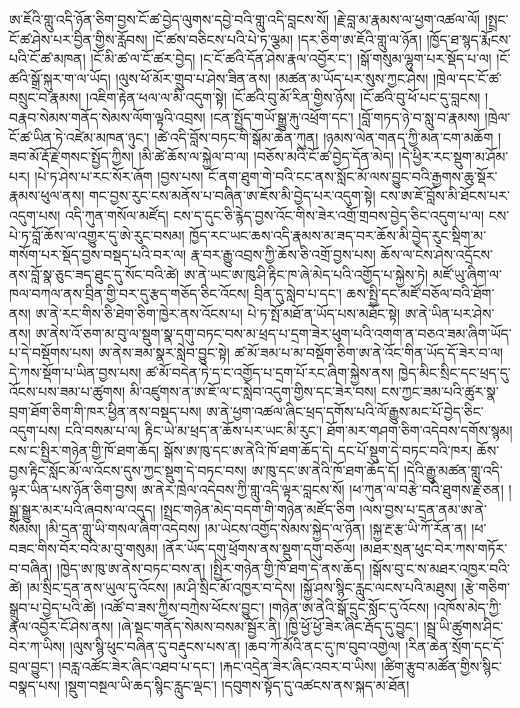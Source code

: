 \documentclass{article}
\begin{document}
ཨ་ཇོའི་གླུ་འདི་ཉོན་ཅིག་བྱས་ངོ་ཚ་བྱེད་ལུགས་དབྱེ་བའི་གླུ་འདི་བླངས་སོ། །རྗེ་བླ་མ་རྣམས་ལ་ཕྱག་འཚལ་ལོ། །སྤྲང་ངོ་ཚ་ཤེས་པར་བྱིན་གྱིས་རློབས། །ངོ་ཚས་བཅིངས་པའི་པེ་ཏ་ལྕམ། །དར་ཅིག་ཨ་ཇོའི་གླུ་ལ་ཉོན། །ཁྱོད་ཐ་སྙད་རྨོངས་པའི་ངོ་ཚ་མཁན། །ངོ་མི་ཚ་ལ་ངོ་ཚར་བྱེད། །ང་ངོ་ཚའི་དོན་ཤེས་རྣལ་འབྱོར་ང་། །སྒོ་གསུམ་ལྷུག་པར་སྡོད་པ་ལ། །ངོ་ཚའི་སྒྲོ་སྐུར་ག་ལ་ཡོད། །ལུས་ཕོ་མོར་གྲུབ་པ་ཤེས་ཟིན་ནས། །མཚན་མ་ཡོད་པར་སུས་ཀྱང་ཤེས། །ཁྲེལ་དང་ངོ་ཚ་བསྲུང་བ་རྣམས། །འཇིག་རྟེན་ཕལ་ལ་མི་འདུག་སྟེ། །ངོ་ཚའི་བུ་མོ་རིན་གྱིས་ཉོས། །ངོ་ཚའི་བུ་ཕོ་པང་དུ་བླངས། །བརྣབ་སེམས་གནོད་སེམས་ལོག་ལྟའི་འབྲས། །ངན་སྤྱོད་གཡོ་སྒྱུ་རྐུ་འཕྲོག་དང་། །བློ་གཏད་ཉེ་བ་སླུ་བ་རྣམས། །ཁྲེལ་ངོ་ཚ་ཡིན་ཏེ་འཛེམ་མཁན་ཉུང་། །ཚེ་འདི་བློས་བཏང་གི་སྒོམ་ཆེན་ཀུན། །ཉམས་ལེན་གནད་ཀྱི་མན་ངག་མཆོག །ཟབ་མོ་རྡོ་རྗེ་གསང་སྤྱོད་ཀྱིས། །མི་ཚེ་ཆོས་ལ་སྐྱེལ་བ་ལ། །བཅོས་མའི་ངོ་ཚ་བྱེད་དོན་མེད། །དེ་ཕྱིར་རང་སྡུག་མ་ཤོམ་པར། །པེ་ཏ་ཤེས་པ་རང་སོར་ཞོག །བྱས་པས། ངོ་ནག་ཐུག་གེ་བའི་ངང་ནས་སློང་མོ་ལས་བྱུང་བའི་རྒྱགས་ཆུ་སྡོར་རྣམས་ཕུལ་ནས། གང་བྱས་རུང་ངས་མནོས་པ་བཞིན་ཨ་ཇོས་མི་བྱེད་པར་འདུག་སྟེ། ངས་ཨ་ཇོ་བློས་མི་ཐོངས་པར་འདུག་པས། འདི་ཀུན་གསོལ་མཛོད། ངས་ད་དུང་ཅི་རྙེད་བྱས་འོང་གིས་ཟེར་འགྲོ་གྲབས་བྱེད་ཅིང་འདུག་པ་ལ། ངས་པེ་ཏ་བློ་ཆོས་ལ་འགྱུར་དུ་ཨེ་རུང་བསམ། ཁྱོད་རང་ཡང་ཆས་འདི་རྣམས་མ་ཟད་བར་ཆོས་མི་བྱེད་རུང་སྡིག་མ་གསོག་པར་སྡོད་བྱས་བསྡད་པའི་བར་ལ། རྣ་བར་རྒྱུ་འབྲས་ཀྱི་ཆོས་ཅི་འགྲོ་བྱས་པས། ཆོས་ལ་ངེས་ཤེས་འདྲོངས་ནས་བློ་སྣ་ཅུང་ཟད་ཐུང་དུ་སོང་བའི་ཚེ། ཨ་ནེ་ཡང་ཨ་ཁུ་ཤི་རྟིང་ཁ་ཞེ་མེད་པའི་འགྱོད་པ་སྐྱེས་ཏེ། མཛོ་ཡུ་ཞིག་ལ་ཁལ་བཀལ་ནས་བྲིན་གྱི་བར་དུ་རྩད་གཅོད་ཅིང་འོངས། བྲིན་དུ་སླེབ་པ་དང་། ཆས་སྤྱི་དང་མཛོ་བཅོལ་བའི་ཐོག་ནས། ཨ་ནེ་རང་གིས་ཅི་ཐེག་ཅིག་ཁྱེར་ནས་འོངས་པ། པེ་ཏ་སྤོ་མཐོ་ན་ཡོད་པས་མཐོང་སྟེ། ཨ་ནེ་ཡིན་པར་ཤེས་ནས། ཨ་ནེས་འོ་ཅག་མ་བུ་ལ་སྡུག་སྣ་དགུ་བཏང་བས་མ་ཕྲད་པ་དྲག་ཟེར་ཕུག་པའི་འགག་ན་བཅའ་ཟམ་ཞིག་ཡོད་པ་དེ་བསྡོགས་པས། ཨ་ནེས་ཟམ་སྣར་སླེབ་བྱུང་སྟེ། ཚ་མོ་ཟམ་པ་མ་བསྡོག་ཅིག་ཨ་ནེ་འོང་གིན་ཡོད་དོ་ཟེར་བ་ལ། དེ་ཀས་སྡོག་པ་ཡིན་བྱས་པས། ཚ་མོ་བདེན་ཏེ་ད་ང་འགྱོད་པ་དྲག་པོ་རང་ཞིག་སྐྱེས་ནས། ཁྱེད་མིང་སྲིང་དང་ཕྲད་དུ་འོངས་པས་ཟམ་པ་ཚུགས། མི་འཛུགས་ན་ཨ་ཇོ་ལ་ང་སླེབ་འདུག་གྱིས་དང་ཟེར་བས། ངས་ཀྱང་ཟམ་པའི་ཚུར་སྣ་བྲག་ཐོག་ཅིག་གི་ཁར་ཕྱིན་ནས་བསྡད་པས། ཨ་ནེ་ཕྱག་འཚལ་ཞིང་ཕྲད་དགོས་པའི་ལོ་རྒྱུས་མང་པོ་བྱེད་ཅིང་འདུག་པས། ངའི་བསམ་པ་ལ། རྟིང་ཡེ་མ་ཕྲད་ན་ཆོས་པར་ཡང་མི་རུང་། ཐོག་མར་གཤག་ཅིག་འདེབས་དགོས་སྙམ། ངས་ང་སྤྱིར་གཉེན་གྱི་ཁོ་ཐག་ཆོད། སྒོས་ཨ་ཁུ་དང་ཨ་ནེའི་ཁོ་ཐག་ཆོད་དེ། དང་པོ་སྡུག་དེ་བཏང་བའི་ཁར། ཆོས་བྱས་རྟིང་སློང་མོ་ལ་འོངས་དུས་ཀྱང་སྡུག་དེ་བཏང་བས། ཨ་ཁུ་དང་ཨ་ནེའི་ཁོ་ཐག་ཆོད་དོ། །དེའི་རྒྱུ་མཚན་གླུ་འདི་ལྟར་ཡིན་པས་ཉོན་ཅིག་བྱས། ཨ་ནེར་ཁྲེལ་འདེབས་ཀྱི་གླུ་འདི་ལྟར་བླངས་སོ། །ཕ་ཀུན་ལ་བརྩེ་བའི་ཐུགས་རྗེ་ཅན། །སྒྲ་སྒྱུར་མར་པའི་ཞབས་ལ་འདུད། །སྤྲང་གཉེན་མེད་བདག་གི་གཉེན་མཛོད་ཅིག །ལས་བྱས་པ་དྲན་ནམ་ཨ་ནེ་སོམས། །མི་དྲན་གླུ་ཡི་གསལ་ཞིག་འདེབས། །མ་ཡེངས་འགྱོད་སེམས་སྐྱེད་ལ་ཉོན། །སྐྱ་རྔ་རྩ་ཡི་ཀོ་རོན་ན། །ཕ་བཟང་གིས་བོར་བའི་མ་བུ་གསུམ། །ནོར་ཡོད་དགུ་ཕྲོགས་ནས་སྡུག་དགུ་བཅོལ། །མཐར་སྲན་ཕུང་བེར་ཀས་གཏོར་བ་བཞིན། །ཁྱེད་ཨ་ཁུ་ཨ་ནེས་བཏང་བས་ན། །སྤྱིར་གཉེན་གྱི་ཁོ་ཐག་དེ་ནས་ཆོད། །སྒོས་བུ་ང་ས་མཐར་འཁྱར་བའི་ཚེ། །མ་སྲིང་དྲན་ནས་ཡུལ་དུ་འོངས། །མ་ཤི་སྲིང་མོ་འཁྱར་བ་དེས། །སྐྱོ་ཤས་སྙིང་རླུང་ལངས་པའི་མཐུས། །རྩེ་གཅིག་སྒྲུབ་པ་བྱེད་པའི་ཚེ། །འཚོ་བ་ཟས་ཀྱིས་བཀྲེས་ཕོངས་བྱུང་། །གཉེན་ཨ་ནེའི་སྒོ་དྲུང་སློང་དུ་འོངས། །འཁོས་མེད་ཀྱི་རྣལ་འབྱོར་ངོ་ཤེས་ནས། །ཞེ་སྡང་གནོད་སེམས་བསམ་སྦྱོར་ནི། །ཁྱི་ཕྱོ་ཕྱོ་ཟེར་ཞིང་རྦོད་དུ་བྱུང་། །སྦྲ་ཡི་ཚུགས་ཤིང་བེར་ཀ་ཡིས། །ལུས་སྙི་ཕུང་བཞིན་དུ་བརྡུངས་པས་ན། །ཆབ་ཀོ་མོའི་ནང་དུ་ཁ་བུབ་འགྱེལ། །རིན་ཆེན་སྲོག་དང་དོ་བྲལ་བྱུང་། །བརླ་འཚོང་ཟེར་ཞིང་འཐབ་པ་དང་། །རྐང་འདྲེན་ཟེར་ཞིང་འབར་བ་ཡིས། །ཚིག་རྩུབ་མཚོན་གྱིས་སྙིང་བསྣད་པས། །སྡུག་བསྔལ་ཡི་ཆད་སྙིང་རླུང་ལྡང་། །དབུགས་སྟོད་དུ་འཚངས་ནས་སྐད་མ་ཐོན། 
\end{document}
